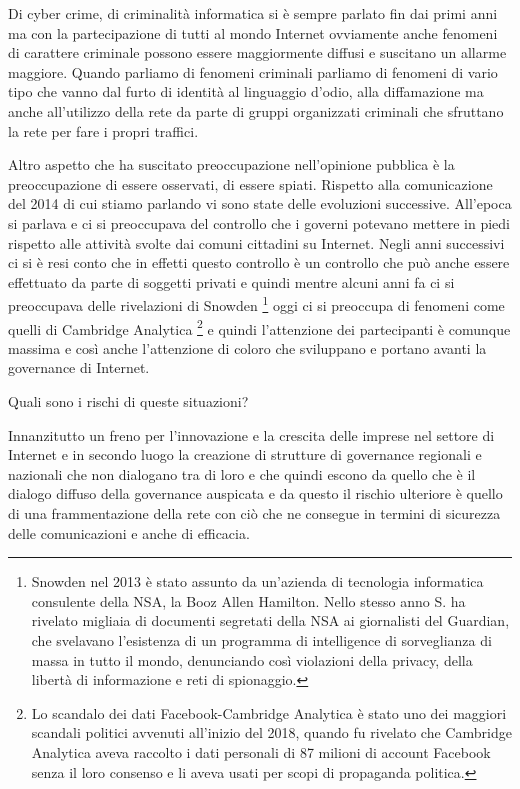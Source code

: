 Di cyber crime, di criminalità informatica si è sempre parlato fin dai primi anni ma con la partecipazione di tutti al mondo Internet ovviamente anche fenomeni di carattere criminale possono essere maggiormente diffusi e  suscitano un allarme maggiore. Quando parliamo di fenomeni criminali parliamo di fenomeni di vario tipo che vanno dal furto di identità al linguaggio d'odio, alla diffamazione ma anche all'utilizzo della rete da parte di gruppi organizzati criminali che sfruttano la rete per fare i propri traffici.

Altro aspetto che ha suscitato preoccupazione nell'opinione pubblica è la preoccupazione di essere osservati, di essere spiati. Rispetto alla comunicazione del 2014 di cui stiamo parlando vi sono state delle evoluzioni successive. All'epoca si parlava e ci si preoccupava del controllo che i governi potevano mettere in piedi rispetto alle attività svolte dai comuni cittadini su Internet. Negli anni successivi ci si è resi conto che in effetti questo controllo è un controllo che può anche essere effettuato da parte di soggetti privati e quindi mentre alcuni anni fa ci si preoccupava delle rivelazioni di Snowden \footnote{Snowden nel 2013 è stato assunto da un'azienda di tecnologia informatica consulente della NSA, la Booz Allen Hamilton. Nello stesso anno S. ha rivelato migliaia di documenti segretati della NSA ai giornalisti del Guardian, che svelavano l’esistenza di un programma di intelligence di sorveglianza di massa in tutto il mondo, denunciando così violazioni della privacy, della libertà di informazione e reti di spionaggio.} oggi ci si preoccupa di fenomeni come quelli di Cambridge Analytica \footnote{Lo scandalo dei dati Facebook-Cambridge Analytica è stato uno dei maggiori scandali politici avvenuti all'inizio del 2018, quando fu rivelato che Cambridge Analytica aveva raccolto i dati personali di 87 milioni di account Facebook senza il loro consenso e li aveva usati per scopi di propaganda politica.} e quindi l'attenzione dei partecipanti è comunque massima e così anche l'attenzione di coloro che sviluppano e portano avanti la governance di Internet. 

Quali sono i rischi di queste situazioni? 

Innanzitutto un freno per l'innovazione e la crescita delle imprese nel settore di Internet e in secondo luogo la creazione di strutture di governance regionali e nazionali che non dialogano tra di loro e che quindi escono da quello che è il dialogo diffuso della governance auspicata e da questo il rischio ulteriore è quello di una frammentazione della rete con ciò che ne consegue in termini di sicurezza delle comunicazioni e anche di efficacia.

